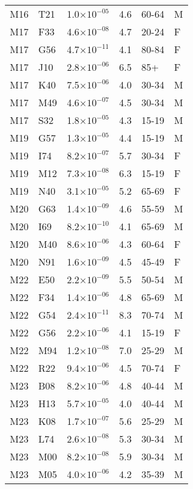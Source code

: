 \begin{longtable}{lllrll}
   M16 & T21 & 1.0$\times10^{-05}$ & 4.6 & 60-64 & M \\ 
   M17 & F33 & 4.6$\times10^{-08}$ & 4.7 & 20-24 & F \\ 
   M17 & G56 & 4.7$\times10^{-11}$ & 4.1 & 80-84 & F \\ 
   M17 & J10 & 2.8$\times10^{-06}$ & 6.5 & 85+ & F \\ 
   M17 & K40 & 7.5$\times10^{-06}$ & 4.0 & 30-34 & M \\ 
   M17 & M49 & 4.6$\times10^{-07}$ & 4.5 & 30-34 & M \\ 
   M17 & S32 & 1.8$\times10^{-05}$ & 4.3 & 15-19 & M \\ 
   M19 & G57 & 1.3$\times10^{-05}$ & 4.4 & 15-19 & M \\ 
   M19 & I74 & 8.2$\times10^{-07}$ & 5.7 & 30-34 & F \\ 
   M19 & M12 & 7.3$\times10^{-08}$ & 6.3 & 15-19 & F \\ 
   M19 & N40 & 3.1$\times10^{-05}$ & 5.2 & 65-69 & F \\ 
   M20 & G63 & 1.4$\times10^{-09}$ & 4.6 & 55-59 & M \\ 
   M20 & I69 & 8.2$\times10^{-10}$ & 4.1 & 65-69 & M \\ 
   M20 & M40 & 8.6$\times10^{-06}$ & 4.3 & 60-64 & F \\ 
   M20 & N91 & 1.6$\times10^{-09}$ & 4.5 & 45-49 & F \\ 
   M22 & E50 & 2.2$\times10^{-09}$ & 5.5 & 50-54 & M \\ 
   M22 & F34 & 1.4$\times10^{-06}$ & 4.8 & 65-69 & M \\ 
   M22 & G54 & 2.4$\times10^{-11}$ & 8.3 & 70-74 & M \\ 
   M22 & G56 & 2.2$\times10^{-06}$ & 4.1 & 15-19 & F \\ 
   M22 & M94 & 1.2$\times10^{-08}$ & 7.0 & 25-29 & M \\ 
   M22 & R22 & 9.4$\times10^{-06}$ & 4.5 & 70-74 & F \\ 
   M23 & B08 & 8.2$\times10^{-06}$ & 4.8 & 40-44 & M \\ 
   M23 & H13 & 5.7$\times10^{-05}$ & 4.0 & 40-44 & M \\ 
   M23 & K08 & 1.7$\times10^{-07}$ & 5.6 & 25-29 & M \\ 
   M23 & L74 & 2.6$\times10^{-08}$ & 5.3 & 30-34 & M \\ 
   M23 & M00 & 8.2$\times10^{-08}$ & 5.9 & 30-34 & M \\ 
   M23 & M05 & 4.0$\times10^{-06}$ & 4.2 & 35-39 & M \\ 

\end{longtable}
